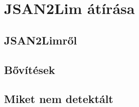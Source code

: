 \chapter{JSAN2Lim átírása}\label{chap:JSAN2Lim átírása}

\section{JSAN2Limről}

\section{Bővítések}

\section{Miket nem detektált}


